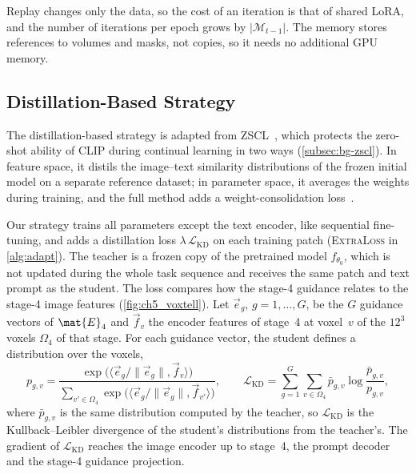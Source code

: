 Replay changes only the data, so the cost of an iteration is that of shared LoRA, and the number of iterations per epoch grows by $|\mathcal{M}_{t-1}|$.
The memory stores references to volumes and masks, not copies, so it needs no additional GPU memory.

\subsection{Distillation-Based Strategy}
\label{subsec:method-distillation}

The distillation-based strategy is adapted from ZSCL~\cite{zheng2023preventingzeroshottransferdegradation}, which protects the zero-shot ability of CLIP during continual learning in two ways (\cref{subsec:bg-zscl}).
In feature space, it distils the image--text similarity distributions of the frozen initial model on a separate reference dataset; in parameter space, it averages the weights during training, and the full method adds a weight-consolidation loss~\cite[Sec.~3.2--3.3, Table~2]{zheng2023preventingzeroshottransferdegradation}.

Our strategy trains all parameters except the text encoder, like sequential fine-tuning, and adds a distillation loss $\lambda\,\mathcal{L}_{\mathrm{KD}}$ on each training patch (\textsc{ExtraLoss} in \cref{alg:adapt}).
The teacher is a frozen copy of the pretrained model $f_{\theta_0}$, which is not updated during the whole task sequence and receives the same patch and text prompt as the student.
The loss compares how the stage-4 guidance relates to the stage-4 image features (\cref{fig:ch5_voxtell}).
Let $\vec{e}_g$, $g = 1, \dots, G$, be the $G$ guidance vectors of $\mat{E}_4$ and $\vec{f}_v$ the encoder features of stage~4 at voxel~$v$ of the $12^3$ voxels $\Omega_4$ of that stage.
For each guidance vector, the student defines a distribution over the voxels,
\begin{equation}
p_{g,v} = \frac{\exp\big(\langle \vec{e}_g / \|\vec{e}_g\|, \vec{f}_v \rangle\big)}{\sum_{v' \in \Omega_4} \exp\big(\langle \vec{e}_g / \|\vec{e}_g\|, \vec{f}_{v'} \rangle\big)},
\qquad
\mathcal{L}_{\mathrm{KD}} = \sum_{g=1}^{G} \sum_{v \in \Omega_4} \bar{p}_{g,v} \log \frac{\bar{p}_{g,v}}{p_{g,v}},
\label{eq:method-kd}
\end{equation}
where $\bar{p}_{g,v}$ is the same distribution computed by the teacher, so $\mathcal{L}_{\mathrm{KD}}$ is the Kullback--Leibler divergence of the student's distributions from the teacher's.
The gradient of $\mathcal{L}_{\mathrm{KD}}$ reaches the image encoder up to stage~4, the prompt decoder and the stage-4 guidance projection.

